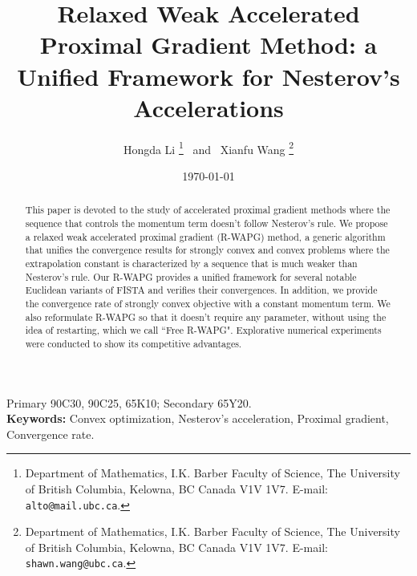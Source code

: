\documentclass[12pt]{article}
\begin{document}
\title{{\selectfont
        Relaxed Weak Accelerated Proximal Gradient Method: a Unified Framework for Nesterov's Accelerations
    }}

\author{
    Hongda Li
    \thanks{Department of Mathematics, I.K. Barber Faculty of Science,
    The University of British Columbia, Kelowna, BC Canada V1V 1V7. E-mail:  \texttt{alto@mail.ubc.ca}.}~ and ~Xianfu Wang
    \thanks{Department of Mathematics, I.K. Barber Faculty of Science,
    The University of British Columbia, Kelowna, BC Canada V1V 1V7. E-mail:  \texttt{shawn.wang@ubc.ca}.}
}

\date{\today}

\maketitle


\begin{abstract}
    \noindent
    This paper is devoted to the study of accelerated proximal gradient methods where the sequence that controls the momentum term doesn't follow Nesterov's rule.
    We propose a relaxed weak accelerated proximal gradient (R-WAPG) method, a generic algorithm that unifies the convergence results for strongly convex and convex problems where the extrapolation constant is characterized by a sequence that is much weaker than Nesterov's rule.
    Our R-WAPG provides a unified framework for several notable Euclidean variants of FISTA and verifies their convergences.
    In addition, we provide the convergence rate of strongly convex objective with a constant momentum term.
    We also reformulate R-WAPG so that it doesn't require any parameter, without using the idea of restarting, which we call ``Free R-WAPG".
    Explorative numerical experiments were conducted to show its competitive advantages.
\end{abstract}

Primary 90C30, 90C25, 65K10; Secondary 65Y20.
\\{\bfseries Keywords: }
Convex optimization, Nesterov's acceleration, Proximal gradient, Convergence rate.
\end{document}
